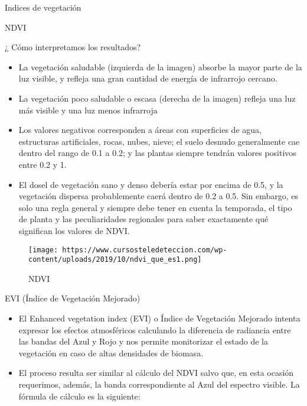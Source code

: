 \documentclass[
  ignorenonframetext,
]{beamer}
\begin{document}
\begin{frame}{Indices de vegetación}
\begin{block}{NDVI}
\begin{block}{¿ Cómo interpretamos los resultados?}
\protect\hypertarget{cuxf3mo-interpretamos-los-resultados}{}
\begin{itemize}
\item
  La vegetación saludable (izquierda de la imagen) absorbe la mayor
  parte de la luz visible, y refleja una gran cantidad de energía de
  infrarrojo cercano.
\item
  La vegetación poco saludable o escasa (derecha de la imagen) refleja
  una luz más visible y una luz menos infrarroja
\item
  Los valores negativos corresponden a áreas con superficies de agua,
  estructuras artificiales, rocas, nubes, nieve; el suelo desnudo
  generalmente cae dentro del rango de 0.1 a 0.2; y las plantas siempre
  tendrán valores positivos entre 0.2 y 1.
\item
  El dosel de vegetación sano y denso debería estar por encima de 0.5, y
  la vegetación dispersa probablemente caerá dentro de 0.2 a 0.5. Sin
  embargo, es solo una regla general y siempre debe tener en cuenta la
  temporada, el tipo de planta y las peculiaridades regionales para
  saber exactamente qué significan los valores de NDVI.
\end{itemize}

\begin{figure}
\centering
\texttt{[image: https://www.cursosteledeteccion.com/wp-content/uploads/2019/10/ndvi\_que\_es1.png]}
\caption{NDVI}
\end{figure}
\end{block}
\end{block}

\begin{block}{EVI (Índice de Vegetación Mejorado)}
\protect\hypertarget{evi-uxedndice-de-vegetaciuxf3n-mejorado}{}
\begin{itemize}
\item
  El Enhanced vegetation index (EVI) o Índice de Vegetación Mejorado
  intenta expresar los efectos atmosféricos calculando la diferencia de
  radiancia entre las bandas del Azul y Rojo y nos permite monitorizar
  el estado de la vegetación en caso de altas densidades de biomasa.
\item
  El proceso resulta ser similar al cálculo del NDVI salvo que, en esta
  ocasión requerimos, además, la banda correspondiente al Azul del
  espectro visible. La fórmula de cálculo es la siguiente:
\end{itemize}
\end{block}
\end{frame}
\end{document}
